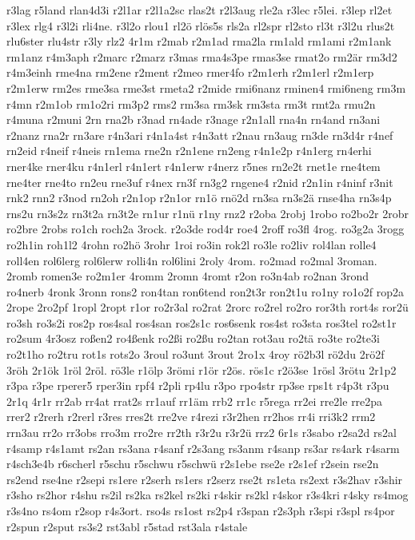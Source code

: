 {r3lag
r5land
rlan4d3i
r2l1ar
r2l1a2sc
rlas2t
r2l3aug
rle2a
r3lec
r5lei.
r3lep
rl2et
r3lex
rlg4
r3l2i
rli4ne.
r3l2o
rlou1
rl2ö
rlös5s
rls2a
rl2spr
rl2sto
rl3t
r3l2u
rlus2t
rlu6ster
rlu4str
r3ly
rlz2
4r1m
r2mab
r2m1ad
rma2la
rm1ald
rm1ami
r2m1ank
rm1anz
r4m3aph
r2marc
r2marz
r3mas
rma4s3pe
rmas3se
rmat2o
rm2är
rm3d2
r4m3einh
rme4na
rm2ene
r2ment
r2meo
rmer4fo
r2m1erh
r2m1erl
r2m1erp
r2m1erw
rm2es
rme3sa
rme3st
rmeta2
r2mide
rmi6nanz
rminen4
rmi6neng
rm3m
r4mn
r2m1ob
rm1o2ri
rm3p2
rms2
rm3sa
rm3sk
rm3sta
rm3t
rmt2a
rmu2n
r4muna
r2muni
2rn
rna2b
r3nad
rn4ade
r3nage
r2n1all
rna4n
rn4and
rn3ani
r2nanz
rna2r
rn3are
r4n3ari
r4n1a4st
r4n3att
r2nau
rn3aug
rn3de
rn3d4r
r4nef
rn2eid
r4neif
r4neis
rn1ema
rne2n
r2n1ene
rn2eng
r4n1e2p
r4n1erg
rn4erhi
rner4ke
rner4ku
r4n1erl
r4n1ert
r4n1erw
r4nerz
r5nes
rn2e2t
rnet1e
rne4tem
rne4ter
rne4to
rn2eu
rne3uf
r4nex
rn3f
rn3g2
rngene4
r2nid
r2n1in
r4ninf
r3nit
rnk2
rnn2
r3nod
rn2oh
r2n1op
r2n1or
rn1ö
rnö2d
rn3sa
rn3s2ä
rnse4ha
rn3s4p
rns2u
rn3s2z
rn3t2a
rn3t2e
rn1ur
r1nü
r1ny
rnz2
r2oba
2robj
1robo
ro2bo2r
2robr
ro2bre
2robs
ro1ch
roch2a
3rock.
r2o3de
rod4r
roe4
2roff
ro3fl
4rog.
ro3g2a
3rogg
ro2h1in
roh1l2
4rohn
ro2hö
3rohr
1roi
ro3in
rok2l
ro3le
ro2liv
rol4lan
rolle4
roll4en
rol6lerg
rol6lerw
rolli4n
rol6lini
2roly
4rom.
ro2mad
ro2mal
3roman.
2romb
romen3e
ro2m1er
4romm
2romn
4romt
r2on
ro3n4ab
ro2nan
3rond
ro4nerb
4ronk
3ronn
rons2
ron4tan
ron6tend
ron2t3r
ron2t1u
ro1ny
ro1o2f
rop2a
2rope
2ro2pf
1ropl
2ropt
r1or
ro2r3al
ro2rat
2rorc
ro2rel
ro2ro
ror3th
rort4s
ror2ü
ro3sh
ro3s2i
ros2p
ros4sal
ros4san
ros2s1c
ros6senk
ros4st
ro3sta
ros3tel
ro2st1r
ro2sum
4r3osz
roßen2
ro4ßenk
ro2ßi
ro2ßu
ro2tan
rot3au
ro2tä
ro3te
ro2te3i
ro2t1ho
ro2tru
rot1s
rots2o
3roul
ro3unt
3rout
2ro1x
4roy
rö2b3l
rö2du
2rö2f
3röh
2r1ök
1röl
2röl.
rö3le
r1ölp
3römi
r1ör
r2ös.
rös1c
r2ö3se
1rösl
3rötu
2r1p2
r3pa
r3pe
rperer5
rper3in
rpf4
r2pli
rp4lu
r3po
rpo4str
rp3se
rps1t
r4p3t
r3pu
2r1q
4r1r
rr2ab
rr4at
rrat2s
rr1auf
rr1äm
rrb2
rr1c
r5rega
rr2ei
rre2le
rre2pa
rrer2
r2rerh
r2rerl
r3res
rres2t
rre2ve
r4rezi
r3r2hen
rr2hos
rr4i
rri3k2
rrm2
rrn3au
rr2o
rr3obs
rro3m
rro2re
rr2th
r3r2u
r3r2ü
rrz2
6r1s
r3sabo
r2sa2d
rs2al
r4samp
r4s1amt
rs2an
rs3ana
r4sanf
r2s3ang
rs3anm
r4sanp
rs3ar
rs4ark
r4sarm
r4sch3e4b
r6scherl
r5schu
r5schwu
r5schwü
r2s1ebe
rse2e
r2s1ef
r2sein
rse2n
rs2end
rse4ne
r2sepi
rs1ere
r2serh
rs1ers
r2serz
rse2t
rs1eta
rs2ext
r3s2hav
r3shir
r3sho
rs2hor
r4shu
rs2il
rs2ka
rs2kel
rs2ki
r4skir
rs2kl
r4skor
r3s4kri
r4sky
rs4mog
r3s4no
rs4om
r2sop
r4s3ort.
rso4s
rs1ost
rs2p4
r3span
r2s3ph
r3spi
r3spl
rs4por
r2spun
r2sput
rs3s2
rst3abl
r5stad
rst3ala
r4stale
}
